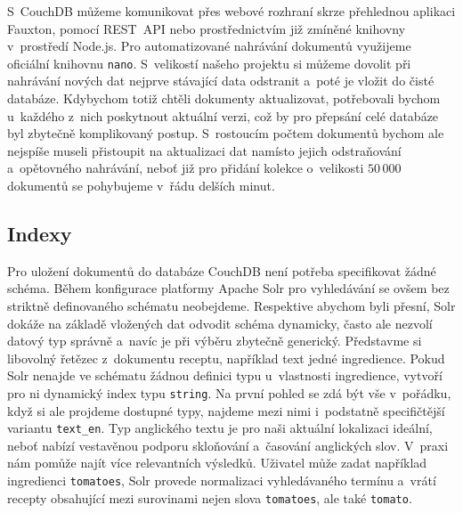 S~CouchDB můžeme komunikovat přes webové rozhraní skrze přehlednou aplikaci Fauxton, pomocí REST~API nebo prostřednictvím již zmíněné knihovny v~prostředí Node.js. Pro automatizované nahrávání dokumentů využijeme oficiální knihovnu \texttt{nano}. S~velikostí našeho projektu si můžeme dovolit při nahrávání nových dat nejprve stávající data odstranit a~poté je vložit do čisté databáze. Kdybychom totiž chtěli dokumenty aktualizovat, potřebovali bychom u~každého z~nich poskytnout aktuální verzi, což by pro přepsání celé databáze byl zbytečně komplikovaný postup. S~rostoucím počtem dokumentů bychom ale nejspíše museli přistoupit na aktualizaci dat namísto jejich odstraňování a~opětovného nahrávání, neboť již pro přidání kolekce o~velikosti $50\,000$ dokumentů se pohybujeme v~řádu delších minut.

\subsection{Indexy}

Pro uložení dokumentů do databáze CouchDB není potřeba specifikovat žádné schéma. Během konfigurace platformy Apache Solr pro vyhledávání se ovšem bez striktně definovaného schématu neobejdeme. Respektive abychom byli přesní, Solr dokáže na základě vložených dat odvodit schéma dynamicky, často ale nezvolí datový typ správně a~navíc je při výběru zbytečně generický. Představme si libovolný řetězec z~dokumentu receptu, například text jedné ingredience. Pokud Solr nenajde ve schématu žádnou definici typu u~vlastnosti ingredience, vytvoří pro ni dynamický index typu \texttt{string}. Na první pohled se zdá být vše v~pořádku, když si ale projdeme dostupné typy, najdeme mezi nimi i~podstatně specifičtější variantu \texttt{text\_en}. Typ anglického textu je pro naši aktuální lokalizaci ideální, neboť nabízí vestavěnou podporu skloňování a~časování anglických slov. V~praxi nám pomůže najít více relevantních výsledků. Uživatel může zadat například ingredienci \texttt{tomatoes}, Solr provede normalizaci vyhledávaného termínu a~vrátí recepty obsahující mezi surovinami nejen slova \texttt{tomatoes}, ale také \texttt{tomato}.

